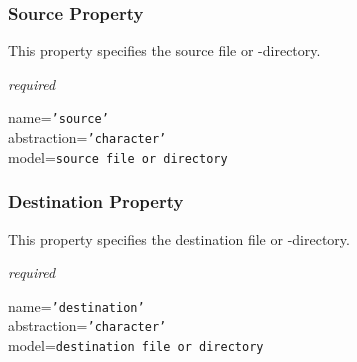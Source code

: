 \subsubsection{Source Property}

This property specifies the source file or -directory.

\emph{required}

name=\texttt{'source'}\\
abstraction=\texttt{'character'}\\
model=\texttt{source file or directory}

\subsubsection{Destination Property}

This property specifies the destination file or -directory.

\emph{required}

name=\texttt{'destination'}\\
abstraction=\texttt{'character'}\\
model=\texttt{destination file or directory}
